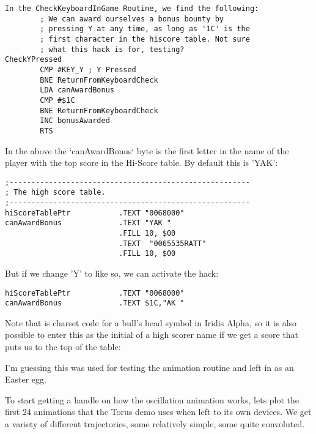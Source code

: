 \clearpage
\begin{definition}
\setlength{\intextsep}{0pt}%
\setlength{\columnsep}{3pt}%
\small
\begin{lstlisting}[basicstyle=\tiny]
In the CheckKeyboardInGame Routine, we find the following:
        ; We can award ourselves a bonus bounty by
        ; pressing Y at any time, as long as '1C' is the
        ; first character in the hiscore table. Not sure
        ; what this hack is for, testing?
CheckYPressed   
        CMP #KEY_Y ; Y Pressed
        BNE ReturnFromKeyboardCheck
        LDA canAwardBonus
        CMP #$1C
        BNE ReturnFromKeyboardCheck
        INC bonusAwarded
        RTS
\end{lstlisting}

In the above the `canAwardBonus` byte is the first letter in the name of the player with the top score in the Hi-Score table. By default this is 'YAK':

\begin{lstlisting}[basicstyle=\tiny]
;-------------------------------------------------------
; The high score table.
;-------------------------------------------------------
hiScoreTablePtr           .TEXT "0068000"
canAwardBonus             .TEXT "YAK "
                          .FILL 10, $00
                          .TEXT  "0065535RATT"
                          .FILL 10, $00
\end{lstlisting}
But if we change 'Y' to  like so, we can activate the hack:

\begin{lstlisting}[basicstyle=\tiny]
hiScoreTablePtr           .TEXT "0068000"
canAwardBonus             .TEXT $1C,"AK "
\end{lstlisting}

Note that  is charset code for a bull's head symbol in Iridis Alpha, so it is also possible to enter this as the initial of a high scorer name if we get a score that puts us to the top of the table:

%



I'm guessing this was used for testing the animation routine and left in as an Easter egg.
\end{definition}

To start getting a handle on how the oscillation animation works, lets plot the first 24 animations that the Torus
demo uses when left to its own devices. We get a variety of different trajectories, some relatively simple, some
quite convoluted.

